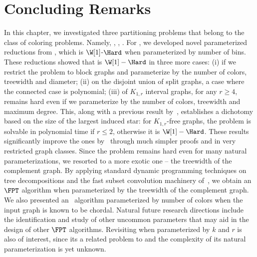 \section{Concluding Remarks}

In this chapter, we investigated three partitioning problems that belong to the class of coloring problems.
Namely, , , .
For , we developed novel parameterized reductions from , which is $\W[1]$-$\Hard$ when parameterized by number of bins.
These reductions showed that  is $\W[1]-\Hard$ in three more cases: (i) if we restrict the problem to block graphs and parameterize by the number of colors, treewidth and diameter; (ii) on the disjoint union of split graphs, a case where the connected case is polynomial; (iii)  of $K_{1,r}$ interval graphs, for any $r \geq 4$, remains hard even if we parameterize by the number of colors, treewidth and maximum degree.
This, along with a previous result by~\cite{claw_free_de_werra}, establishes a dichotomy based on the size of the largest induced star: for $K_{1,r}$-free graphs, the problem is solvable in polynomial time if $r \leq 2$, otherwise it is $\W[1]-\Hard$.
These results significantly improve the ones by~\cite{colorful_treewidth} through much simpler proofs and in very restricted graph classes.
Since the problem remains hard even for many natural parameterizations, we resorted to a more exotic one -- the treewidth of the complement graph.
By applying standard dynamic programming techniques on tree decompositions and the fast subset convolution machinery of~\cite{fourier_mobius}, we obtain an $\FPT$ algorithm when parameterized by the treewidth of the complement graph.
We also presented an \XP\ algorithm parameterized by number of colors when the input graph is known to be chordal.
Natural future research directions include the identification and study of other uncommon parameters that may aid in the design of other $\FPT$ algorithms.
Revisiting  when parameterized by $k$ and $r$ is also of interest, since its a related problem to  and the complexity of its natural parameterization is yet unknown.

